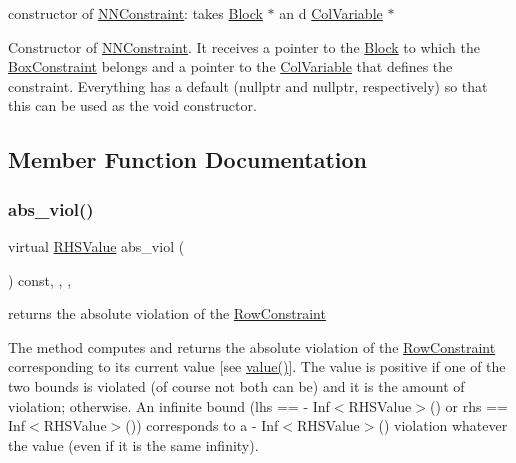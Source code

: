 constructor of \mbox{\hyperlink{class_s_m_spp__di__unipi__it_1_1_n_n_constraint}{N\+N\+Constraint}}\+: takes \mbox{\hyperlink{class_s_m_spp__di__unipi__it_1_1_block}{Block}} $\ast$ an d \mbox{\hyperlink{class_s_m_spp__di__unipi__it_1_1_col_variable}{Col\+Variable}} $\ast$ 

Constructor of \mbox{\hyperlink{class_s_m_spp__di__unipi__it_1_1_n_n_constraint}{N\+N\+Constraint}}. It receives a pointer to the \mbox{\hyperlink{class_s_m_spp__di__unipi__it_1_1_block}{Block}} to which the \mbox{\hyperlink{class_s_m_spp__di__unipi__it_1_1_box_constraint}{Box\+Constraint}} belongs and a pointer to the \mbox{\hyperlink{class_s_m_spp__di__unipi__it_1_1_col_variable}{Col\+Variable}} that defines the constraint. Everything has a default (nullptr and nullptr, respectively) so that this can be used as the void constructor. 

\subsection{Member Function Documentation}
\mbox{\label{class_s_m_spp__di__unipi__it_1_1_n_n_constraint_a1e06e555eab5078e4d5ec16745778984}} 
\subsubsection{\texorpdfstring{abs\+\_\+viol()}{abs\_viol()}}
{\footnotesize\ttfamily virtual \mbox{\hyperlink{class_s_m_spp__di__unipi__it_1_1_row_constraint_a8813536ab3b13a81c8e83a999ade3bd8}{R\+H\+S\+Value}} abs\+\_\+viol (\begin{DoxyParamCaption}\item[{void}]{ }\end{DoxyParamCaption}) const\hspace{0.3cm}{\ttfamily [inline]}, {\ttfamily [final]}, {\ttfamily [override]}, {\ttfamily [virtual]}}



returns the absolute violation of the \mbox{\hyperlink{class_s_m_spp__di__unipi__it_1_1_row_constraint}{Row\+Constraint}} 

The method computes and returns the absolute violation of the \mbox{\hyperlink{class_s_m_spp__di__unipi__it_1_1_row_constraint}{Row\+Constraint}} corresponding to its current value \mbox{[}see \mbox{\hyperlink{class_s_m_spp__di__unipi__it_1_1_one_var_constraint_ad9256be16b98f3b557f54fa5e2118db7}{value()}}\mbox{]}. The value is positive if one of the two bounds is violated (of course not both can be) and it is the amount of violation; otherwise. An infinite bound (lhs == -\/ Inf$<$\+R\+H\+S\+Value$>$() or rhs == Inf$<$\+R\+H\+S\+Value$>$()) corresponds to a -\/ Inf$<$\+R\+H\+S\+Value$>$() violation whatever the value (even if it is the same infinity).

